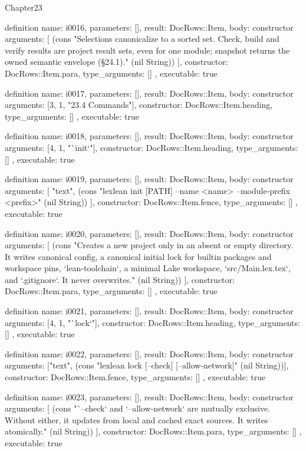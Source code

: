 \begin{lexlean}{Chapter23}
\begin{semanticmodule}
definition{
  name: i0016,
  parameters: [],
  result: DocRows::Item,
  body: constructor{
    arguments: [
      (cons "Selections canonicalize to a sorted set. Check, build and verify results are project result sets, even for one module; snapshot returns the owned semantic envelope (§24.1)." (nil String))
    ],
    constructor: DocRows::Item.para,
    type_arguments: []
  },
  executable: true
}

definition{
  name: i0017,
  parameters: [],
  result: DocRows::Item,
  body: constructor{
    arguments: [3, 1, "23.4 Commands"],
    constructor: DocRows::Item.heading,
    type_arguments: []
  },
  executable: true
}

definition{
  name: i0018,
  parameters: [],
  result: DocRows::Item,
  body: constructor{
    arguments: [4, 1, "`init`"],
    constructor: DocRows::Item.heading,
    type_arguments: []
  },
  executable: true
}

definition{
  name: i0019,
  parameters: [],
  result: DocRows::Item,
  body: constructor{
    arguments: [
      "text",
      (cons "lexlean init [PATH] --name <name> --module-prefix <prefix>" (nil String))
    ],
    constructor: DocRows::Item.fence,
    type_arguments: []
  },
  executable: true
}

definition{
  name: i0020,
  parameters: [],
  result: DocRows::Item,
  body: constructor{
    arguments: [
      (cons "Creates a new project only in an absent or empty directory. It writes canonical config, a canonical initial lock for builtin packages and workspace pins, `lean-toolchain`, a minimal Lake workspace, `src/Main.lex.tex`, and `.gitignore`. It never overwrites." (nil String))
    ],
    constructor: DocRows::Item.para,
    type_arguments: []
  },
  executable: true
}

definition{
  name: i0021,
  parameters: [],
  result: DocRows::Item,
  body: constructor{
    arguments: [4, 1, "`lock`"],
    constructor: DocRows::Item.heading,
    type_arguments: []
  },
  executable: true
}

definition{
  name: i0022,
  parameters: [],
  result: DocRows::Item,
  body: constructor{
    arguments: ["text", (cons "lexlean lock [--check] [--allow-network]" (nil String))],
    constructor: DocRows::Item.fence,
    type_arguments: []
  },
  executable: true
}

definition{
  name: i0023,
  parameters: [],
  result: DocRows::Item,
  body: constructor{
    arguments: [
      (cons "`--check` and `--allow-network` are mutually exclusive. Without either, it updates from local and cached exact sources. It writes atomically." (nil String))
    ],
    constructor: DocRows::Item.para,
    type_arguments: []
  },
  executable: true
}


\end{semanticmodule}
\end{lexlean}
